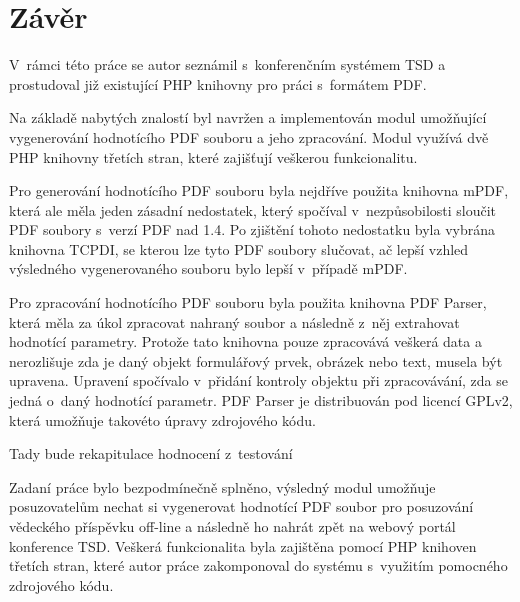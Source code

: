 \chapter{Závěr}
 V~rámci této práce se autor seznámil s~konferenčním systémem TSD a prostudoval již existující PHP knihovny pro práci s~formátem PDF.
\par
Na základě nabytých znalostí byl navržen a implementován modul umožňující vygenerování hodnotícího PDF souboru a jeho zpracování. Modul využívá dvě PHP knihovny třetích stran, které zajišťují veškerou funkcionalitu. 
\par
Pro generování hodnotícího PDF souboru byla nejdříve použita knihovna mPDF, která ale měla jeden zásadní nedostatek, který spočíval v~nezpůsobilosti sloučit PDF soubory s~verzí PDF nad 1.4. Po zjištění tohoto nedostatku byla vybrána knihovna TCPDI, se kterou lze tyto PDF soubory slučovat, ač lepší vzhled výsledného vygenerovaného souboru bylo lepší v~případě mPDF. 
\par
Pro zpracování hodnotícího PDF souboru byla použita knihovna PDF Parser, která měla za úkol zpracovat nahraný soubor a následně z~něj extrahovat hodnotící parametry. Protože tato knihovna pouze zpracovává veškerá data a nerozlišuje zda je daný objekt formulářový prvek, obrázek nebo text, musela být upravena. Upravení spočívalo v~přidání kontroly objektu při zpracovávání, zda se jedná o~daný hodnotící parametr. PDF Parser je distribuován pod licencí GPLv2, která umožňuje takovéto úpravy zdrojového kódu.
\par
Tady bude rekapitulace hodnocení z~testování
\par
Zadaní práce bylo bezpodmínečně splněno, výsledný modul umožňuje posuzovatelům nechat si vygenerovat hodnotící PDF soubor pro posuzování vědeckého příspěvku off-line a následně ho nahrát zpět na webový portál konference TSD. Veškerá funkcionalita byla zajištěna pomocí PHP knihoven třetích stran, které autor práce zakomponoval do systému s~využitím pomocného zdrojového kódu.